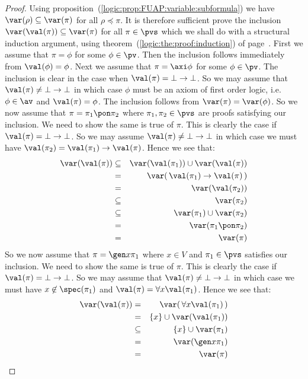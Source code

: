 \begin{proof}
Using proposition~(\ref{logic:prop:FUAP:variable:subformula}) we
have $\var(\rho)\subseteq\var(\pi)$ for all $\rho\preceq\pi$. It is
therefore sufficient prove the inclusion
$\var(\val(\pi))\subseteq\var(\pi)$ for all $\pi\in\pvs$ which we
shall do with a structural induction argument, using
theorem~(\ref{logic:the:proof:induction}) of
page~\pageref{logic:the:proof:induction}. First we assume that
$\pi=\phi$ for some $\phi\in\pv$. Then the inclusion follows
immediately from $\val(\phi)=\phi$. Next we assume that
$\pi=\axi\phi$ for some $\phi\in\pv$. The inclusion is clear in the
case when $\val(\pi)=\bot\to\bot$. So we may assume that
$\val(\pi)\neq\bot\to\bot$ in which case $\phi$ must be an axiom of
first order logic, i.e. $\phi\in\av$ and $\val(\pi)=\phi$. The
inclusion follows from $\var(\pi)=\var(\phi)$. So we now assume that
$\pi=\pi_{1}\pon\pi_{2}$ where $\pi_{1},\pi_{2}\in\pvs$ are proofs
satisfying our inclusion. We need to show the same is true of $\pi$.
This is clearly the case if $\val(\pi)=\bot\to\bot$. So we may
assume $\val(\pi)\neq\bot\to\bot$ in which case we must have
$\val(\pi_{2})=\val(\pi_{1})\to\val(\pi)$. Hence we see that:
    \begin{eqnarray*}
    \var(\val(\pi))&\subseteq&\var(\val(\pi_{1}))\cup\var(\val(\pi))\\
    &=&\var(\,\val(\pi_{1})\to\val(\pi)\,)\\
    &=&\var(\val(\pi_{2}))\\
    &\subseteq&\var(\pi_{2})\\
    &\subseteq&\var(\pi_{1})\cup\var(\pi_{2})\\
    &=&\var(\pi_{1}\pon\pi_{2})\\
    &=&\var(\pi)\\
    \end{eqnarray*}
So we now assume that $\pi=\gen x\pi_{1}$ where $x\in V$ and
$\pi_{1}\in\pvs$ satisfies our inclusion. We need to show the same
is true of $\pi$. This is clearly the case if
$\val(\pi)=\bot\to\bot$. So we may assume that
$\val(\pi)\neq\bot\to\bot$ in which case we must have
$x\not\in\spec(\pi_{1})$ and $\val(\pi)=\forall x\val(\pi_{1})$.
Hence we see that:
    \begin{eqnarray*}
    \var(\val(\pi))&=&\var(\,\forall x\val(\pi_{1})\,)\\
    &=&\{x\}\cup\var(\val(\pi_{1}))\\
    &\subseteq&\{x\}\cup\var(\pi_{1})\\
    &=&\var(\gen x\pi_{1})\\
    &=&\var(\pi)\\
    \end{eqnarray*}
\end{proof}
